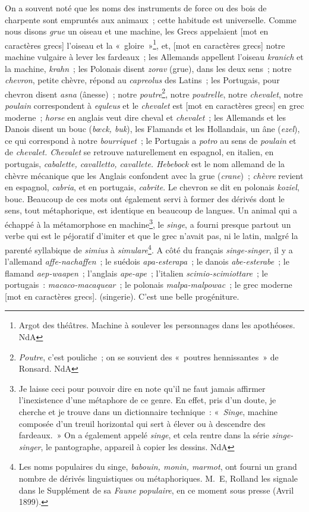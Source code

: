 \documentclass[french,twoside]{book} %
\begin{document}
On a souvent noté que les noms des instruments de force ou des bois de charpente sont empruntés aux animaux ; cette habitude est universelle. Comme nous disons {\itshape grue} un oiseau et une machine, les Grecs appelaient [mot en caractères grecs] l’oiseau et la « gloire »\footnote{ Argot des théâtres. Machine à soulever les personnages dans les apothéoses. NdA}, et, [mot en caractères grecs] notre machine vulgaire à lever les fardeaux ; les Allemands appellent l’oiseau {\itshape kranich} et la machine, {\itshape krahn} ; les Polonais disent {\itshape zorav} (grue), dans les deux sens ; notre {\itshape chevron}, petite chèvre, répond au {\itshape capreolus} des Latins ; les Portugais, pour chevron disent {\itshape asna} (ânesse) ; notre {\itshape poutre}\footnote{ {\itshape Poutre}, c’est pouliche ; on se souvient des « poutres hennissantes » de Ronsard. NdA}, notre {\itshape poutrelle}, notre {\itshape chevalet}, notre {\itshape poulain} correspondent à {\itshape equleus} et le {\itshape chevalet} est [mot en caractères grecs] en grec moderne ; {\itshape horse} en anglais veut dire cheval et {\itshape chevalet} ; les Allemands et les Danois disent un bouc ({\itshape bœck, buk}), les Flamands et les Hollandais, un âne ({\itshape ezel}), ce qui correspond à notre {\itshape bourriquet} ; le Portugais a {\itshape potro} au sens de {\itshape poulain} et de {\itshape chevalet. Chevalet} se retrouve naturellement en espagnol, en italien, en portugais, {\itshape cabalette, cavalletto, cavallete. Hebebock} est le nom allemand de la chèvre mécanique que les Anglais confondent avec la grue ({\itshape crane}) ; {\itshape chèvre} revient en espagnol, {\itshape cabria}, et en portugais, {\itshape cabrite}. Le chevron se dit en polonais {\itshape koziel}, bouc. Beaucoup de ces mots ont également servi à former des dérivés dont le sens, tout métaphorique, est identique en beaucoup de langues. Un animal qui a échappé à la métamorphose en machine\footnote{ Je laisse ceci pour pouvoir dire en note qu’il ne faut jamais affirmer l’inexistence d’une métaphore de ce genre. En effet, pris d’un doute, je cherche et je trouve dans un dictionnaire technique : « {\itshape Singe}, machine composée d’un treuil horizontal qui sert à élever ou à descendre des fardeaux. » On a également appelé {\itshape singe}, et cela rentre dans la série {\itshape singe-singer}, le pantographe, appareil à copier les dessins. NdA}, le {\itshape singe}, a fourni presque partout un verbe qui est le péjoratif d’imiter et que le grec n’avait pas, ni le latin, malgré la parenté syllabique de {\itshape simius} à {\itshape simulare}\footnote{Les noms populaires du singe, {\itshape babouin, monin, marmot}, ont fourni un grand nombre de dérivés linguistiques ou métaphoriques. M. E, Rolland les signale dans le Supplément de sa {\itshape Faune populaire}, en ce moment sous presse (Avril 1899).}. A côté du français {\itshape singe-singer}, il y a l’allemand {\itshape affe-nachaffen} ; le suédois {\itshape apa-esterapa} ; le danois {\itshape abe-esterabe} ; le flamand {\itshape aep-waapen} ; l’anglais {\itshape ape-ape} ; l’italien {\itshape scimio-scimiottare} ; le portugais : {\itshape macaco-macaquear} ; le polonais {\itshape malpa-malpowac} ; le grec moderne [mot en caractères grecs]. (singerie). C’est une belle progéniture. 
\end{document}
